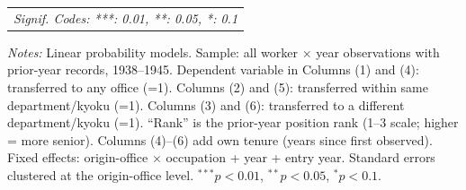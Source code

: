 \begin{table}[htbp]
\begin{threeparttable}
\begin{tabular}{lcccccc}
   \multicolumn{7}{l}{\emph{Signif. Codes: ***: 0.01, **: 0.05, *: 0.1}}\\
\end{tabular}
\begin{tablenotes}[flushleft]\footnotesize
\item \textit{Notes:} Linear probability models. Sample: all worker $\times$ year observations with prior-year records, 1938--1945. Dependent variable in Columns (1) and (4): transferred to any office (=1). Columns (2) and (5): transferred within same department/kyoku (=1). Columns (3) and (6): transferred to a different department/kyoku (=1). ``Rank'' is the prior-year position rank (1--3 scale; higher = more senior). Columns (4)--(6) add own tenure (years since first observed). Fixed effects: origin-office $\times$ occupation + year + entry year. Standard errors clustered at the origin-office level. $^{***}p<0.01$, $^{**}p<0.05$, $^{*}p<0.1$.
\end{tablenotes}\end{threeparttable}\end{table}

